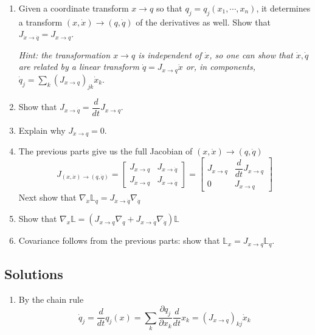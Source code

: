 \documentclass[12pt]{article}
\begin{document}
\begin{enumerate}[label=(\alph*), topsep=0pt]
    \item Given a coordinate transform $x\to q$ so that $q_j=q_j(x_1, \cdots, x_n)$, 
    it determines a transform $(x, \dot x)\to (q, \dot q)$ of the derivatives as well. 
    Show that $J_{\dot x\to \dot q} = J_{x\to q}$. 
    
    \textit{Hint: the transformation $x\to q$ is independent of $\dot x$, 
    so one can show that $\dot x, \dot q$ are related by a linear transform 
    $\dot q = J_{x\to q}\dot x$ or, in components, 
    $\dot q_j = \sum_k (J_{x\to q})_{jk} \dot x_k$}. 

    \item Show that $J_{x\to \dot q} = \dfrac d {dt} J_{x\to q}$. 
    \item Explain why $J_{\dot x\to q}=0$. 
    \item The previous parts give us the full Jacobian of $(x, \dot x)\to (q, \dot q)$ 
    \[  
        J_{(x, \dot x)\to (q, \dot q)} = \begin{bmatrix}
            J_{x\to q} & J_{x\to \dot q} \\ 
            J_{\dot x\to q} & J_{\dot x\to \dot q} 
        \end{bmatrix} = \begin{bmatrix}
            J_{x\to q} & \dfrac d {dt} J_{x\to q} \\ 0 & J_{x\to q}
        \end{bmatrix}
    \] 
    Next show that $\nabla_{\dot x} \mathbb L_q = J_{\dot x\to \dot q}\nabla_{\dot q}$ 
    \item Show that 
    $\nabla_x \mathbb L = \left(J_{x\to q}\nabla_q + J_{x\to \dot q}\nabla_{\dot q}\right)\mathbb L$ 
    \item Covariance follows from the previous parts: show that $\mathbb L_x = J_{x\to q}\mathbb L_q$. 
\end{enumerate}


\subsection{Solutions}
\begin{enumerate}[label=(\alph*), topsep=0pt]
    \item By the chain rule
    \[ 
        \dot q_j = \dfrac d {dt} q_j(x) 
        = \sum_k \dfrac{\partial q_j}{\partial x_k} \dfrac d {dt} x_k = (J_{x\to q})_{kj}\dot x_k 
    \] 
\end{enumerate}
\end{document}
